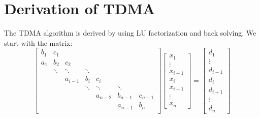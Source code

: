 \documentclass[landscape]{article}
\begin{document}
\doublespacing
\MOONSTITLE
\maketitle

\section{Derivation of TDMA}
The TDMA algorithm is derived by using LU factorization and back solving. We start with the matrix:
\[
\left[
\begin{array}{ccccccccc}
b_{1} & c_{1}    &           &           &           &           &         \\
a_{1} & b_{2}    & c_{2}     &           &           &           &         \\
      & \ddots   & \ddots    & \ddots    &           &           &         \\
      &          & a_{i-1}   & b_{i}     & c_{i}     &           &         \\
      &          &           & \ddots    & \ddots    & \ddots    &         \\
      &          &           &           & a_{n-2}   & b_{n-1}   & c_{n-1} \\
      &          &           &           &           & a_{n-1}   & b_{n}   \\
\end{array} \right]
\left[ \begin{array}{c}
x_{1} \\ \vdots \\ x_{i-1} \\ x_{i} \\ x_{i+1} \\ \vdots \\ x_{n}
\end{array} \right]
=
\left[ \begin{array}{c}
d_{1} \\ \vdots \\ d_{i-1} \\ d_{i} \\ d_{i+1} \\ \vdots \\ d_{n}
\end{array} \right]
\]
\end{document}
